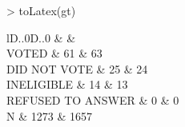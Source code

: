 \begin{Schunk}
\begin{Sinput}
> toLatex(gt)
\end{Sinput}
\begin{Soutput}
\begin{tabular}{lD{.}{.}{0}D{.}{.}{0}}
\toprule
 &  &  \\
\midrule
VOTED & 61 & 63 \\
DID NOT VOTE & 25 & 24 \\
INELIGIBLE & 14 & 13 \\
REFUSED TO ANSWER & 0 & 0 \\
N & 1273 & 1657 \\
\bottomrule
\end{tabular}
\end{Soutput}
\end{Schunk}
